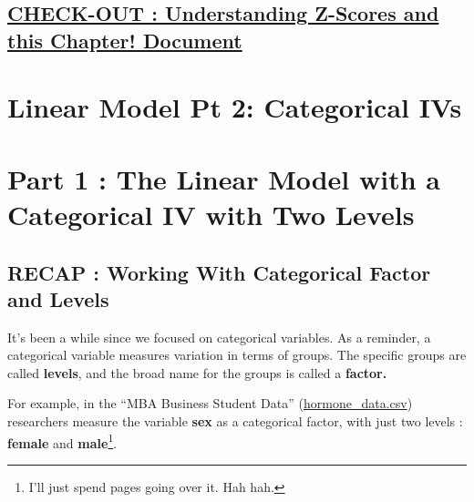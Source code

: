 \documentclass[
  letterpaper,
  DIV=11,
  numbers=noendperiod,
  oneside]{scrreprt}
\newenvironment{Shaded}{\begin{snugshade}}{\end{snugshade}}
\newcommand{\AttributeTok}[1]{\textcolor[rgb]{0.40,0.45,0.13}{#1}}
\newcommand{\FunctionTok}[1]{\textcolor[rgb]{0.28,0.35,0.67}{#1}}
\newcommand{\NormalTok}[1]{\textcolor[rgb]{0.00,0.23,0.31}{#1}}
\newcommand{\OtherTok}[1]{\textcolor[rgb]{0.00,0.23,0.31}{#1}}
\newcommand{\SpecialCharTok}[1]{\textcolor[rgb]{0.37,0.37,0.37}{#1}}
\newcommand{\StringTok}[1]{\textcolor[rgb]{0.13,0.47,0.30}{#1}}
\begin{document}
\section{\texorpdfstring{\href{https://docs.google.com/forms/d/e/1FAIpQLSdpzsYEijsSkaG_gRA4Pmqg1QFGWmTSUUmR8B31cYNtms6jtw/viewform?usp=sf_link}{CHECK-OUT
: Understanding Z-Scores and this Chapter!
Document}}{CHECK-OUT : Understanding Z-Scores and this Chapter! Document}}\label{check-out-understanding-z-scores-and-this-chapter-document}

\chapter{Linear Model Pt 2: Categorical
IVs}\label{linear-model-pt-2-categorical-ivs}

\chapter{Part 1 : The Linear Model with a Categorical IV with Two
Levels}\label{part-1-the-linear-model-with-a-categorical-iv-with-two-levels}

\section{RECAP : Working With Categorical Factor and
Levels}\label{recap-working-with-categorical-factor-and-levels}

It's been a while since we focused on categorical variables. As a
reminder, a categorical variable measures variation in terms of groups.
The specific groups are called \textbf{levels}, and the broad name for
the groups is called a \textbf{factor.}~

For example, in the ``MBA Business Student Data''
(\href{https://www.dropbox.com/scl/fi/b2vq1yi5azwb5u8j7xe74/hormone_data.csv?rlkey=lv77ppuseg5cmqsy99pal55ct&dl=0}{hormone\_data.csv})
researchers measure the variable \textbf{sex} as a categorical factor,
with just two levels : \textbf{female} and \textbf{male}\footnote{I'll
  just spend pages going over it. Hah hah.}.

\begin{Shaded}
\end{Shaded}
\end{document}
